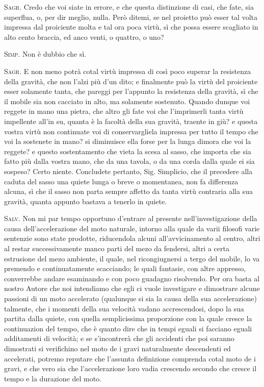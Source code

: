 \documentclass[11pt,twoside,openany]{book}
\newcommand{\speaker}[1]{\textcolor{rubric}{\textsc{#1}}\space}
\begin{document}
\speaker{Sagr.} Credo che voi siate in errore, e che questa distinzione di casi, che fate, sia superflua, o, per dir meglio, nulla. Però ditemi, se nel proietto può esser tal volta impressa dal proiciente molta e tal ora poca virtù, sì che possa essere scagliato in alto cento braccia, ed anco venti, o quattro, o uno?

\speaker{Simp.} Non è dubbio che sì.

\speaker{Sagr.} E non meno potrà cotal virtù impressa di così poco superar la resistenza della gravità, che non l'alzi più d'un dito; e finalmente può la virtù del proiciente esser solamente tanta, che pareggi per l'appunto la resistenza della gravità, sì che il mobile sia non cacciato in alto, ma solamente sostenuto. Quando dunque voi reggete in mano una pietra, che altro gli fate voi che l'imprimerli tanta virtù impellente all'in su, quanta è la facoltà della sua gravità, traente in giù? e questa vostra virtù non continuate voi di conservargliela impressa per tutto il tempo che voi la sostenete in mano? si diminuisce ella forse per la lunga dimora che voi la reggete? e questo sostentamento che vieta la scesa al sasso, che importa che sia fatto più dalla vostra mano, che da una tavola, o da una corda dalla quale ei sia sospeso? Certo niente. Concludete pertanto, Sig. Simplicio, che il precedere alla caduta del sasso una quiete lunga o breve o momentanea, non fa differenza alcuna, sì che il sasso non parta sempre affetto da tanta virtù contraria alla sua gravità, quanta appunto bastava a tenerlo in quiete.

\speaker{Salv.} Non mi par tempo opportuno d'entrare al presente nell'investigazione della causa dell'accelerazione del moto naturale, intorno alla quale da varii filosofi varie sentenzie sono state prodotte, riducendola alcuni all'avvicinamento al centro, altri al restar successivamente manco parti del mezo da fendersi, altri a certa estrusione del mezo ambiente, il quale, nel ricongiugnersi a tergo del mobile, lo va premendo e continuatamente scacciando; le quali fantasie, con altre appresso, converrebbe andare esaminando e con poco guadagno risolvendo. Per ora basta al nostro Autore che noi intendiamo che egli ci vuole investigare e dimostrare alcune passioni di un moto accelerato (qualunque si sia la causa della sua accelerazione) talmente, che i momenti della sua velocità vadano accrescendosi, dopo la sua partita dalla quiete, con quella semplicissima proporzione con la quale cresce la continuazion del tempo, che è quanto dire che in tempi eguali si facciano eguali additamenti di velocità; e se s'incontrerà che gli accidenti che poi saranno dimostrati si verifichino nel moto de i gravi naturalmente descendenti ed accelerati, potremo reputare che l'assunta definizione comprenda cotal moto de i gravi, e che vero sia che l'accelerazione loro vadia crescendo secondo che cresce il tempo e la durazione del moto.
\end{document}
